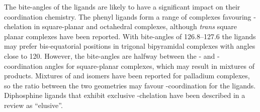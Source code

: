 The bite-angles of the \tBuxantphos{} ligands are likely to have a significant impact on their coordination chemistry.  The phenyl ligands form a range of complexes favouring \cis-chelation in square-planar and octahedral complexes, although \emph{trans} square planar complexes have been reported\cite{Petocz2004}.  With bite-angles of 126.8--127.6\degrees{} the \tBuxantphos{} ligands may prefer bis-equatorial positions in trigonal bipyramidal complexes with angles close to 120\degrees.  However, the bite-angles are halfway between the \cis{}- and \trans{}-coordination angles for square-planar complexes, which may result in mixtures of products.  Mixtures of \cis{} and \trans{} isomers have been reported for palladium \Phxantphos{} complexes, so the ratio between the two geometries may favour \trans{}-coordination for the \tBuxantphos{} ligands.\cite{Zuideveld2002, Petocz2004} Diphosphine ligands that exhibit exclusive \trans-chelation have been described in a review as ``elusive''.\cite{Freixa2008}  




